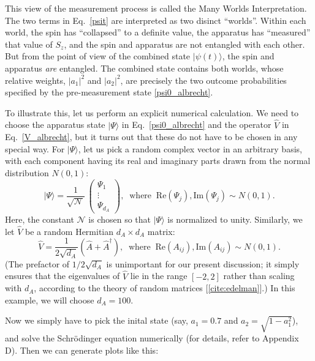 \documentclass[pra,12pt]{revtex4-2}
\begin{document}
This view of the measurement process is called the Many Worlds
Interpretation.  The two terms in Eq.~\eqref{psit} are interpreted as
two disinct ``worlds''.  Within each world, the spin has ``collapsed''
to a definite value, the apparatus has ``measured'' that value of
$S_z$, and the spin and apparatus are not entangled with each other.
But from the point of view of the combined state $|\psi(t)\rangle$,
the spin and apparatus \textit{are} entangled.  The combined state
contains both worlds, whose relative weights, $|a_1|^2$ and $|a_2|^2$,
are precisely the two outcome probabilities specified by the
pre-measurement state \eqref{psi0_albrecht}.

To illustrate this, let us perform an explicit numerical calculation.
We need to choose the apparatus state $|\Psi\rangle$ in
Eq.~\eqref{psi0_albrecht} and the operator $\hat{V}$ in
Eq.~\eqref{V_albrecht}, but it turns out that these do not have to be
chosen in any special way.  For $|\Psi\rangle$, let us pick a random
complex vector in an arbitrary basis, with each component having its
real and imaginary parts drawn from the normal distribution $N(0,1)$:
\begin{equation}
  |\Psi\rangle = \frac{1}{\sqrt{\mathcal{N}}}\, \begin{pmatrix}
    \Psi_1 \\ \vdots \\ \Psi_{d_A}
  \end{pmatrix}, \;\; \mathrm{where} \;\; \mathrm{Re}(\Psi_j), \mathrm{Im}(\Psi_j) \sim N(0,1).
\end{equation}
Here, the constant $\mathcal{N}$ is chosen so that $|\Psi\rangle$ is
normalized to unity.  Similarly, we let $\hat{V}$ be a random
Hermitian $d_A\times d_A$ matrix:
\begin{equation}
  \hat{V} = \frac{1}{2\sqrt{d_A}} \left(\hat{A} + \hat{A}^\dagger\right),
  \;\; \mathrm{where} \;\; \mathrm{Re}(A_{ij}), \mathrm{Im}(A_{ij}) \sim N(0,1).
  \label{gue}
\end{equation}
(The prefactor of $1/2\sqrt{d_A}$ is unimportant for our present
discussion; it simply ensures that the eigenvalues of $\hat{V}$ lie in
the range $[-2,2]$ rather than scaling with $d_A$, according to the
theory of random matrices [\ref{cite:edelman}].)  In this example, we
will choose $d_A = 100$.

Now we simply have to pick the inital state (say, $a_1 = 0.7$ and $a_2
= \sqrt{1-a_1^2}$), and solve the Schr\"odinger equation numerically
(for details, refer to Appendix D).  Then we can generate plots like
this:
\end{document}
